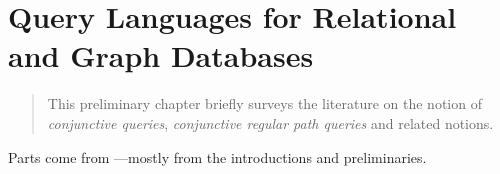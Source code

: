 \chapter{Query Languages for Relational and Graph Databases}
\label{ch:prelim-graph-databases}
\renewcommand\thefigure{\thechapter.\arabic{figure}}

\begin{chapterpresentation}
	\begin{abstract}
		This preliminary chapter briefly surveys the literature on
		the notion of \emph{conjunctive queries},
		\emph{conjunctive regular path queries} and related notions.

	\end{abstract}
	\par\bigskip\bigskip
	\begin{acknowledgements}
		Parts  come from \cite{FigueiraMorvan2025SemanticTreeWidthLMCS,FigueiraMorvanRomero2025Minimizing}---mostly from the introductions
		and preliminaries.
	\end{acknowledgements}
	\clearpagepresentation
	\chaptertocstandalone
\end{chapterpresentation}


